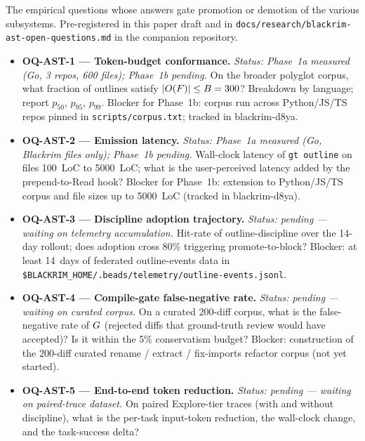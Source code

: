 The empirical questions whose answers gate promotion or demotion of
the various subsystems. Pre-registered in this paper draft and in
\texttt{docs/research/blackrim-ast-open-questions.md} in the
companion repository.

\begin{itemize}[leftmargin=*]
  \item \textbf{OQ-AST-1 — Token-budget conformance.}
        \emph{Status: Phase~1a measured (Go, 3 repos, 600 files);
        Phase~1b pending.}
        On the broader polyglot corpus, what fraction of outlines satisfy
        $|O(F)| \leq B = 300$? Breakdown by
        language; report $p_{50}$, $p_{95}$, $p_{99}$.
        Blocker for Phase~1b: corpus run across Python/JS/TS repos
        pinned in \texttt{scripts/corpus.txt}; tracked in
        blackrim-d8ya.
  \item \textbf{OQ-AST-2 — Emission latency.}
        \emph{Status: Phase~1a measured (Go, Blackrim files only);
        Phase~1b pending.}
        Wall-clock latency of \texttt{gt outline} on files
        100~LoC to 5000~LoC; what is the user-perceived latency
        added by the prepend-to-Read hook?
        Blocker for Phase~1b: extension to Python/JS/TS corpus
        and file sizes up to 5000~LoC (tracked in blackrim-d8ya).
  \item \textbf{OQ-AST-3 — Discipline adoption trajectory.}
        \emph{Status: pending --- waiting on telemetry accumulation.}
        Hit-rate of outline-discipline over the 14-day rollout;
        does adoption cross 80\% triggering promote-to-block?
        Blocker: at least 14~days of federated outline-events data
        in \texttt{\$BLACKRIM\_HOME/.beads/telemetry/\allowbreak outline-events.jsonl}.
  \item \textbf{OQ-AST-4 — Compile-gate false-negative rate.}
        \emph{Status: pending --- waiting on curated corpus.}
        On a curated 200-diff corpus, what is the false-negative
        rate of $G$ (rejected diffs that ground-truth review
        would have accepted)? Is it within the 5\% conservatism
        budget?
        Blocker: construction of the 200-diff curated rename /
        extract / fix-imports refactor corpus (not yet started).
  \item \textbf{OQ-AST-5 — End-to-end token reduction.}
        \emph{Status: pending --- waiting on paired-trace dataset.}
        On paired Explore-tier traces (with and without discipline),
        what is the per-task input-token reduction, the wall-clock
        change, and the task-success delta?

\end{itemize}
